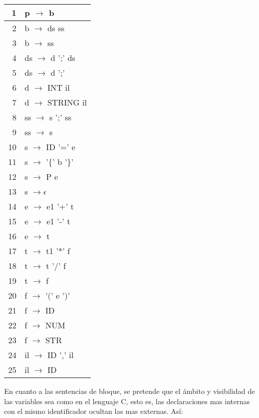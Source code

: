 \vspace{0.5cm}
\begin{small}
\begin{center}
\begin{tabular}{|r|l|}
\hline
1 &  p  $\rightarrow$  b     \\
\hline
2 &  b  $\rightarrow$  ds  ss     \\
\hline
3 &  b  $\rightarrow$  ss         \\
\hline
4 &  ds $\rightarrow$ d  ';'  ds  \\
\hline
5 &  ds $\rightarrow$  d ';'      \\
\hline
6 &  d  $\rightarrow$ INT  il     \\
\hline
7 &  d  $\rightarrow$  STRING  il \\
\hline
8 &  ss $\rightarrow$ s  ';'  ss  \\
\hline
9 &  ss $\rightarrow$  s          \\
\hline
10 &  s  $\rightarrow$  ID '=' e   \\
\hline
11 &  s  $\rightarrow$ '\{' b '\}'   \\
\hline
12 &  s  $\rightarrow$  P  e       \\
\hline
13 &  s $\rightarrow \epsilon$    \\
\hline
14 &  e $\rightarrow$ e1 '+' t    \\
\hline
15 &  e $\rightarrow$ e1 '-' t    \\
\hline
16 &  e $\rightarrow$ t           \\
\hline
17 &  t $\rightarrow$ t1 '*' f    \\
\hline
18 &  t $\rightarrow$ t '/' f     \\
\hline
19 &  t $\rightarrow$ f           \\
\hline
20 &  f $\rightarrow$ '(' e ')'   \\
\hline
21 &  f $\rightarrow$  ID         \\
\hline
22 &  f $\rightarrow$  NUM        \\
\hline
23 &  f $\rightarrow$  STR        \\
\hline
24 &  il $\rightarrow$ ID ',' il  \\
\hline
25 &  il $\rightarrow$ ID         \\
\hline
\end{tabular}
\end{center}
\end{small}
\vspace{0.25cm}
En cuanto a las sentencias de bloque,
se pretende que el ámbito y visibilidad de las variables sea como en el lenguaje
C, esto es, las declaraciones mas internas con el mismo identificador
ocultan las mas externas. Así:

